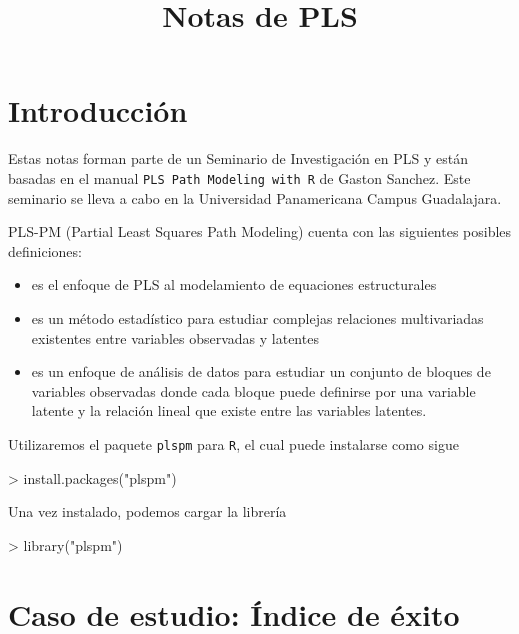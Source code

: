 \documentclass{paper}
\title{Notas de PLS}
\begin{document}


\maketitle

\section{Introducci\'on}

Estas notas forman parte de un Seminario de Investigaci\'on en PLS y est\'an basadas en el manual \texttt{PLS Path Modeling with R} de Gaston Sanchez. Este seminario se lleva a cabo en la Universidad Panamericana Campus Guadalajara. 

PLS-PM (Partial Least Squares Path Modeling) cuenta con las siguientes posibles definiciones:
\begin{itemize}
  \item es el enfoque de PLS al modelamiento de equaciones estructurales
  \item es un m\'etodo estad\'istico para estudiar complejas relaciones multivariadas existentes entre variables observadas y latentes
  \item es un enfoque de an\'alisis de datos para estudiar un conjunto de bloques de variables observadas donde cada bloque puede definirse por una variable latente y la relaci\'on lineal que existe entre las variables latentes.
\end{itemize}

Utilizaremos el paquete \texttt{plspm} para \texttt{R}, el cual puede instalarse como sigue
\begin{Schunk}
\begin{Sinput}
> install.packages("plspm")
\end{Sinput}
\end{Schunk}
Una vez instalado, podemos cargar la librer\'ia
\begin{Schunk}
\begin{Sinput}
> library("plspm")
\end{Sinput}
\end{Schunk}

\section{Caso de estudio: \'Indice de \'exito}
\end{document}

